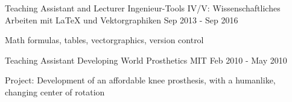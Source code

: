 \begin{cventries}
  \cventry
    {Teaching Assistant and Lecturer} %
    {Ingenieur-Tools IV/V: Wissenschaftliches Arbeiten mit LaTeX und Vektorgraphiken} %
    {} %
    {Sep 2013 - Sep 2016} %
    {
      \begin{cvitems} %
      	\item{Math formulas, tables, vectorgraphics, version control}
      \end{cvitems}
    }
 
    
  \cventry
    {Teaching Assistant} %
    {Developing World Prosthetics} %
    {MIT} %
    {Feb 2010 - May 2010} %
    {
      \begin{cvitems} %
      \item{Project: Development of an affordable knee prosthesis, with a humanlike, changing center of rotation}
      \end{cvitems}
    }
\end{cventries}
